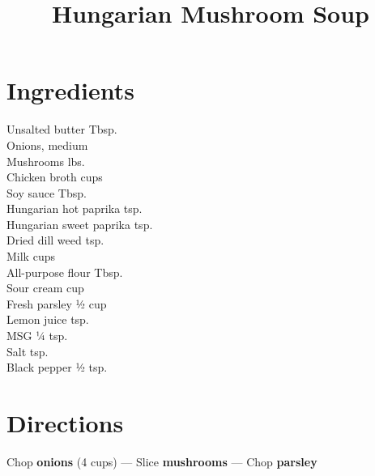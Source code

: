 \documentclass[11pt,letterpaper]{article}
\title{Hungarian Mushroom Soup}
\author{}
\date{}
\begin{document}
\maketitle
\thispagestyle{empty}

\section*{Ingredients}
\setlength{\columnsep}{20pt}
\begin{multicols}{2}
\noindent
    Unsalted butter  Tbsp. \\
    Onions, medium  \\
    Mushrooms  lbs. \\
    Chicken broth  cups \\
    Soy sauce  Tbsp. \\
    Hungarian hot paprika  tsp. \\
    Hungarian sweet paprika  tsp. \\
    Dried dill weed  tsp. \\
    \columnbreak
    Milk  cups \\
    All-purpose flour  Tbsp. \\
    Sour cream  cup \\
    Fresh parsley \dotfill ½ cup \\
    Lemon juice  tsp. \\
    MSG \dotfill ¼ tsp. \\
    Salt  tsp. \\
    Black pepper \dotfill ½ tsp. \\
\end{multicols}

\section*{Directions}

\noindent
Chop \textbf{onions} (4 cups) ---
Slice \textbf{mushrooms} ---
Chop \textbf{parsley}
\end{document}
